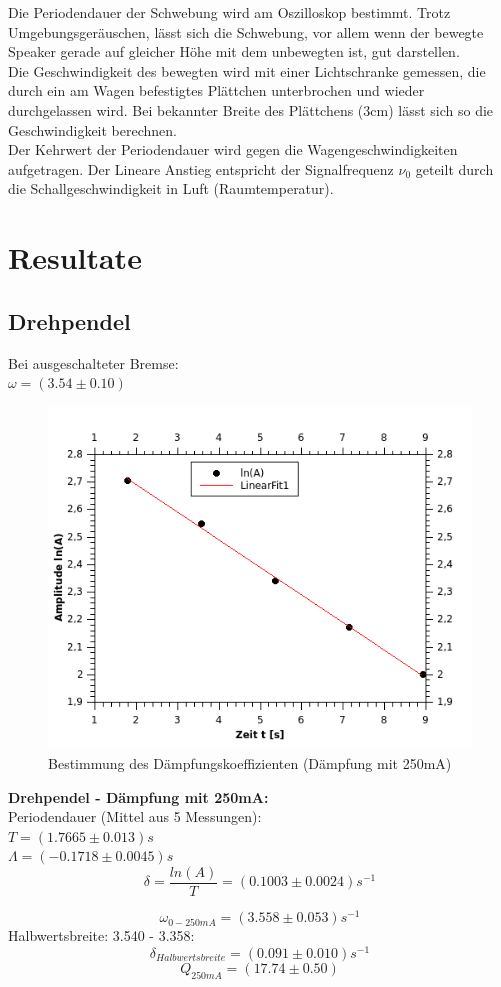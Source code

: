 \documentclass[12pt,a4paper]{article}
\begin{document}
\begin{multicols}{2}
Die Periodendauer der Schwebung wird am Oszilloskop bestimmt. Trotz Umgebungsgeräuschen, lässt sich die Schwebung, vor allem wenn der bewegte Speaker gerade auf gleicher Höhe mit dem unbewegten ist, gut darstellen.\\
Die Geschwindigkeit des bewegten wird mit einer Lichtschranke gemessen, die durch ein am Wagen befestigtes Plättchen unterbrochen und wieder durchgelassen wird. Bei bekannter Breite des Plättchens (3cm) lässt sich so die Geschwindigkeit berechnen.\\
Der Kehrwert der Periodendauer wird gegen die Wagengeschwindigkeiten aufgetragen. Der Lineare Anstieg entspricht der Signalfrequenz $\nu_0$ geteilt durch die Schallgeschwindigkeit in Luft (Raumtemperatur).

\pagebreak
\section{Resultate}
\subsection{Drehpendel}
Bei ausgeschalteter Bremse:\\
$\omega = (3.54 \pm 0.10)$
\begin{figure}[H]
	\centering
	\includegraphics[scale=1.8]{./figure/Messung1_Daempfung_omega0.png}
	\caption{Bestimmung des Dämpfungskoeffizienten (Dämpfung mit 250mA)}
	\label{fig:daempfung_omega0_1}
\end{figure}

\noindent \textbf{Drehpendel - Dämpfung mit 250mA:}\\
Periodendauer (Mittel aus 5 Messungen):\\
$T = (1.7665 \pm 0.013)s$\\
$\Lambda = (-0.1718 \pm 0.0045)s$
$$\delta = \frac{ln(A)}{T} = (0.1003 \pm 0.0024)s^{-1}$$

$$\omega_{0 - 250mA}=(3.558 \pm 0.053)s^{-1}$$
Halbwertsbreite: 3.540 - 3.358:\\
$$\delta_{Halbwertsbreite} = (0.091 \pm 0.010)s^{-1}$$
$$Q_{250mA}=(17.74 \pm 0.50)$$


\end{multicols}
\end{document}
